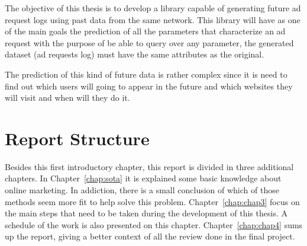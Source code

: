 The objective of this thesis is to develop a library capable of generating
future ad request logs using past data from the same network.
This library will have as one of the main goals the prediction of all the parameters that characterize an
ad request with the purpose of be able to query over any parameter, the
generated dataset (ad requests log) must have the same attributes as the original.

The prediction of this kind of future data is rather complex since it is need to
find out which users will going to appear in the future and which websites they
will visit and when will they do it.

\section{Report Structure} \label{sec:struct}

Besides this first introductory chapter, this report is divided in three additional chapters.
In Chapter~\ref{chap:sota} it is explained some basic knowledge about online marketing. In addiction, there is
a small conclusion of which of those methods seem more fit to help solve this problem.
Chapter~\ref{chap:chap3} focus on the main steps that need to be taken during the development of this thesis. A schedule of the work is also
presented on this chapter.
Chapter~\ref{chap:chap4} sums up the report, giving a better context of all the review done in the final project.
